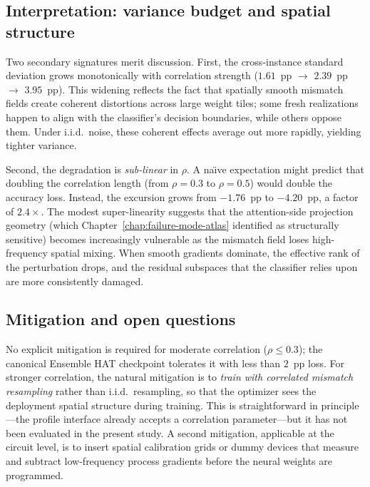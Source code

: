 \subsection{Interpretation: variance budget and spatial structure}

Two secondary signatures merit discussion.  First, the cross-instance standard deviation grows monotonically with correlation strength ($1.61$~pp $\rightarrow$ $2.39$~pp $\rightarrow$ $3.95$~pp).  This widening reflects the fact that spatially smooth mismatch fields create coherent distortions across large weight tiles; some fresh realizations happen to align with the classifier's decision boundaries, while others oppose them.  Under i.i.d.~noise, these coherent effects average out more rapidly, yielding tighter variance.

Second, the degradation is \emph{sub-linear} in $\rho$.  A na\"{\i}ve expectation might predict that doubling the correlation length (from $\rho=0.3$ to $\rho=0.5$) would double the accuracy loss.  Instead, the excursion grows from $-1.76$~pp to $-4.20$~pp, a factor of $2.4\times$.  The modest super-linearity suggests that the attention-side projection geometry (which Chapter~\ref{chap:failure-mode-atlas} identified as structurally sensitive) becomes increasingly vulnerable as the mismatch field loses high-frequency spatial mixing.  When smooth gradients dominate, the effective rank of the perturbation drops, and the residual subspaces that the classifier relies upon are more consistently damaged.

\subsection{Mitigation and open questions}

No explicit mitigation is required for moderate correlation ($\rho \le 0.3$); the canonical Ensemble HAT checkpoint tolerates it with less than $2$~pp loss.  For stronger correlation, the natural mitigation is to \emph{train with correlated mismatch resampling} rather than i.i.d.~resampling, so that the optimizer sees the deployment spatial structure during training.  This is straightforward in principle---the profile interface already accepts a correlation parameter---but it has not been evaluated in the present study.  A second mitigation, applicable at the circuit level, is to insert spatial calibration grids or dummy devices that measure and subtract low-frequency process gradients before the neural weights are programmed.

